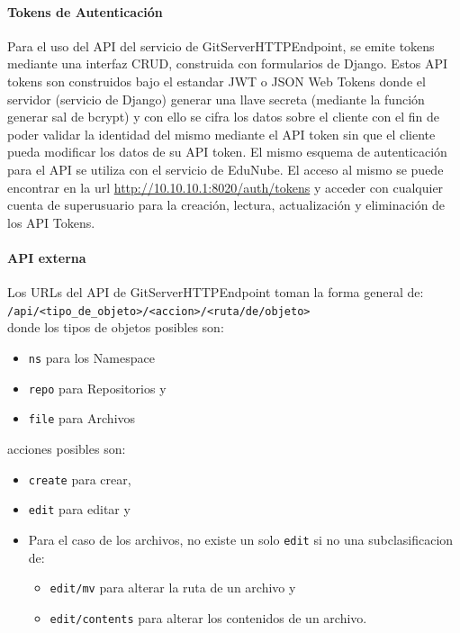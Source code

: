 \paragraph{Tokens de Autenticación}
Para el uso del API del servicio de GitServerHTTPEndpoint, se emite tokens mediante una interfaz CRUD, construida con formularios de Django. Estos API tokens son construidos bajo el estandar JWT o JSON Web Tokens donde el servidor (servicio de Django) generar una llave secreta (mediante la función generar sal de bcrypt) y con ello se cifra los  datos sobre el cliente con el fin de poder validar la identidad del mismo mediante el API token sin que el cliente pueda modificar los datos de su API token. El mismo esquema de autenticación para el API se utiliza con el servicio de EduNube. El acceso al mismo se puede encontrar en la url \url{http://10.10.10.1:8020/auth/tokens} y acceder con cualquier cuenta de superusuario para la creación, lectura, actualización y eliminación de los API Tokens.

\paragraph{API externa}
Los URLs del API de GitServerHTTPEndpoint toman la forma general de: 
\texttt{/api/<tipo\_de\_objeto>/<accion>/<ruta/de/objeto>}\\
donde los tipos de objetos posibles son:
\begin{itemize}
	\item \texttt{ns} para los Namespace
    \item \texttt{repo} para Repositorios y
    \item \texttt{file} para Archivos
\end{itemize}
acciones posibles son:
\begin{itemize}
	\item \texttt{create} para crear,
	\item \texttt{edit} para editar y
    \item Para el caso de los archivos, no existe un solo \texttt{edit} si no una subclasificacion de:
    \begin{itemize}
    	\item \texttt{edit/mv}
        para alterar la ruta de un archivo y 
        \item \texttt{edit/contents}
        para alterar los contenidos de un archivo.
    \end{itemize}
\end{itemize}


